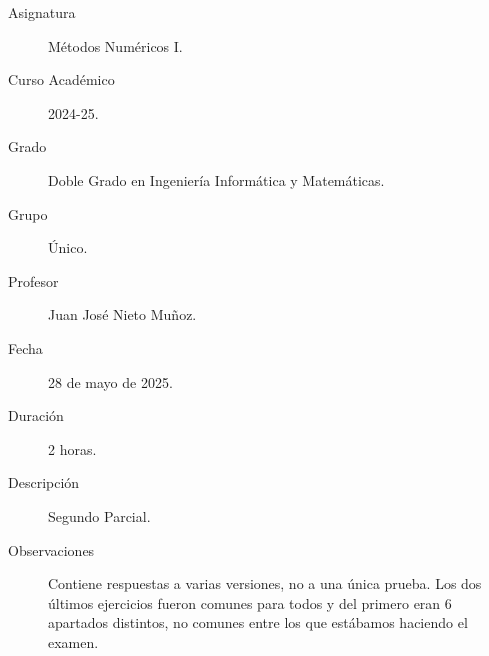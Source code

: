 \documentclass[12pt]{article}
\begin{document}
	
	
	
	
	
	\begin{description}
		\item[Asignatura] Métodos Numéricos I.
		\item[Curso Académico] 2024-25.
		\item[Grado] Doble Grado en Ingeniería Informática y Matemáticas.
		\item[Grupo] Único.
		\item[Profesor] Juan José Nieto Muñoz.
		\item[Fecha] 28 de mayo de 2025.
		\item[Duración] 2 horas.
		\item[Descripción] Segundo Parcial.
		\item[Observaciones] 
		Contiene respuestas a varias versiones, no a una única prueba. Los dos últimos ejercicios fueron comunes para todos y del primero eran 6 apartados distintos, no comunes entre los que estábamos haciendo el examen.
	\end{description}
	\newpage
	
\end{document}
